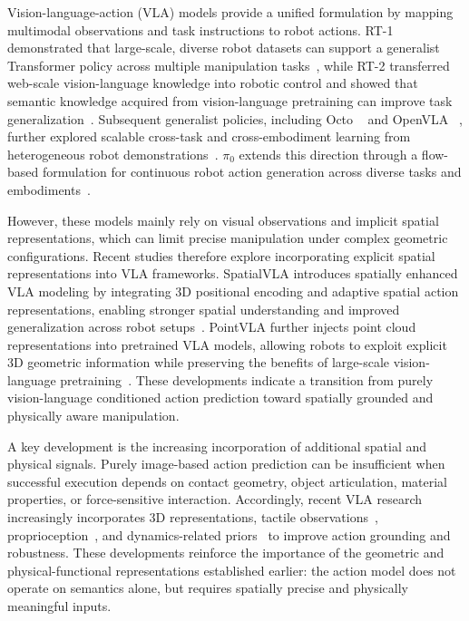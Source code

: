 \documentclass{SCIS2026}
\begin{document}
Vision-language-action (VLA) models provide a unified formulation by mapping multimodal observations and task instructions to robot actions. RT-1 demonstrated that large-scale, diverse robot datasets can support a generalist Transformer policy across multiple manipulation tasks~\cite{brohan2022rt}, while RT-2 transferred web-scale vision-language knowledge into robotic control and showed that semantic knowledge acquired from vision-language pretraining can improve task generalization~\cite{zitkovich2023rt}. Subsequent generalist policies, including Octo ~\cite{team2024octo} and OpenVLA ~\cite{kim2024openvla}, further explored scalable cross-task and cross-embodiment learning from heterogeneous robot demonstrations~\cite{team2024octo,kim2024openvla,openx2023openx}. $\pi_0$ extends this direction through a flow-based formulation for continuous robot action generation across diverse tasks and embodiments~\cite{team2024pi0}.

However, these models mainly rely on visual observations and implicit spatial representations, which can limit precise manipulation under complex geometric configurations. Recent studies therefore explore incorporating explicit spatial representations into VLA frameworks. SpatialVLA introduces spatially enhanced VLA modeling by integrating 3D positional encoding and adaptive spatial action representations, enabling stronger spatial understanding and improved generalization across robot setups~\cite{qu2025spatialvla}. PointVLA further injects point cloud representations into pretrained VLA models, allowing robots to exploit explicit 3D geometric information while preserving the benefits of large-scale vision-language pretraining~\cite{li2026pointvla}. These developments indicate a transition from purely vision-language conditioned action prediction toward spatially grounded and physically aware manipulation.


A key development is the increasing incorporation of additional spatial and physical signals. Purely image-based action prediction can be insufficient when successful execution depends on contact geometry, object articulation, material properties, or force-sensitive interaction. Accordingly, recent VLA research increasingly incorporates 3D representations, tactile observations~\cite{bi2026vla}, proprioception~\cite{wang2026think}, and dynamics-related priors~\cite{hu2023gaia} to improve action grounding and robustness. These developments reinforce the importance of the geometric and physical-functional representations established earlier: the action model does not operate on semantics alone, but requires spatially precise and physically meaningful inputs.
\end{document}

